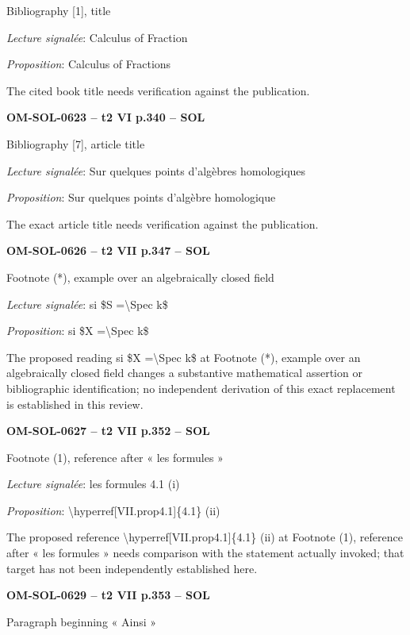 Bibliography [1], title\par
\emph{Lecture signalée}: Calculus of Fraction\par
\emph{Proposition}: Calculus of Fractions\par
The cited book title needs verification against the publication.\par
\par\noindent\textbf{OM-SOL-0623 -- t2 VI p.340 -- SOL}\par
Bibliography [7], article title\par
\emph{Lecture signalée}: Sur quelques points d'algèbres homologiques\par
\emph{Proposition}: Sur quelques points d'algèbre homologique\par
The exact article title needs verification against the publication.\par
\par\noindent\textbf{OM-SOL-0626 -- t2 VII p.347 -- SOL}\par
Footnote (*), example over an algebraically closed field\par
\emph{Lecture signalée}: si \$S =\allowbreak  \textbackslash{}Spec k\$\par
\emph{Proposition}: si \$X =\allowbreak  \textbackslash{}Spec k\$\par
The proposed reading si \$X =\allowbreak  \textbackslash{}Spec k\$ at Footnote (*), example over an algebraically closed field changes a substantive mathematical assertion or bibliographic identification; no independent derivation of this exact replacement is established in this review.\par
\par\noindent\textbf{OM-SOL-0627 -- t2 VII p.352 -- SOL}\par
Footnote (1), reference after « les formules »\par
\emph{Lecture signalée}: les formules 4.1 (i)\par
\emph{Proposition}: \textbackslash{}hyperref[VII.prop4.1]\{4.1\} (ii)\par
The proposed reference \textbackslash{}hyperref[VII.prop4.1]\{4.1\} (ii) at Footnote (1), reference after « les formules » needs comparison with the statement actually invoked; that target has not been independently established here.\par
\par\noindent\textbf{OM-SOL-0629 -- t2 VII p.353 -- SOL}\par
Paragraph beginning « Ainsi »\par
